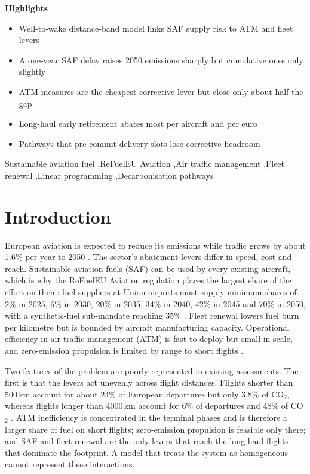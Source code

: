 \documentclass[preprint, 12pt, authoryear]{elsarticle}
\newenvironment{highlights}
  {\vspace{1em}\noindent\textbf{Highlights}
   \begin{itemize}\setlength{\itemsep}{2pt}\setlength{\parskip}{0pt}}
  {\end{itemize}\vspace{0.5em}}
\begin{document}
\begin{frontmatter}
\begin{highlights}
\item Well-to-wake distance-band model links SAF supply risk to ATM and fleet levers
\item A one-year SAF delay raises 2050 emissions sharply but cumulative ones only slightly
\item ATM measures are the cheapest corrective lever but close only about half the gap
\item Long-haul early retirement abates most per aircraft and per euro
\item Pathways that pre-commit delivery slots lose corrective headroom
\end{highlights}

\begin{keyword}
Sustainable aviation fuel \sep ReFuelEU Aviation \sep Air traffic management
\sep Fleet renewal \sep Linear programming \sep Decarbonisation pathways
\end{keyword}

\end{frontmatter}


\section{Introduction}
\label{sec:intro}

European aviation is expected to reduce its emissions while traffic grows by
about 1.6\% per year to 2050 \citep{eurocontrol2024outlook}. The sector's
abatement levers differ in speed, cost and reach. Sustainable aviation fuels
(SAF) can be used by every existing aircraft, which is why the ReFuelEU
Aviation regulation places the largest share of the effort on them: fuel
suppliers at Union airports must supply minimum shares of 2\% in 2025, 6\% in
2030, 20\% in 2035, 34\% in 2040, 42\% in 2045 and 70\% in 2050, with a
synthetic-fuel sub-mandate reaching 35\% \citep{eu2023}. Fleet renewal lowers
fuel burn per kilometre but is bounded by aircraft manufacturing capacity.
Operational efficiency in air traffic management (ATM) is fast to deploy but
small in scale, and zero-emission propulsion is limited by range to short
flights \citep{akinola2025, uddin2025}.

Two features of the problem are poorly represented in existing assessments.
The first is that the levers act unevenly across flight distances. Flights
shorter than 500\,km account for about 24\% of European departures but only
3.8\% of CO$_2$, whereas flights longer than 4000\,km account for 6\% of
departures and 48\% of CO$_2$ \citep{eurocontrol2021}. ATM inefficiency is
concentrated in the terminal phases and is therefore a larger share of fuel on
short flights; zero-emission propulsion is feasible only there; and SAF and
fleet renewal are the only levers that reach the long-haul flights that dominate
the footprint. A model that treats the system as homogeneous cannot represent
these interactions.
\end{document}
